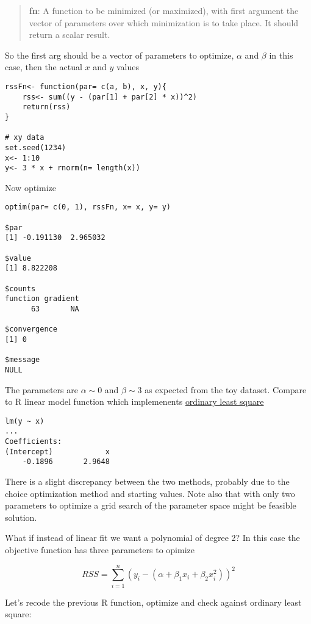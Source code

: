 \documentclass[a4paper]{article}
\begin{document}
\begin{quotation}
\noindent \textbf{fn}: A function to be minimized (or maximized), with first
argument the vector of parameters over which minimization is
to take place.  It should return a scalar result.
\end{quotation}

So the first arg should be a vector of parameters to optimize, $\alpha$ and $\beta$ in this case, then
the actual $x$ and $y$ values

\begin{verbatim}
rssFn<- function(par= c(a, b), x, y){
    rss<- sum((y - (par[1] + par[2] * x))^2)
    return(rss)
}

# xy data
set.seed(1234)
x<- 1:10
y<- 3 * x + rnorm(n= length(x))
\end{verbatim}

Now optimize

\begin{verbatim}
optim(par= c(0, 1), rssFn, x= x, y= y)

$par
[1] -0.191130  2.965032

$value
[1] 8.822208

$counts
function gradient 
      63       NA 

$convergence
[1] 0

$message
NULL
\end{verbatim}

The parameters are $\alpha \sim 0$ and $\beta \sim 3$ as expected from the toy dataset. Compare to R linear model function which
implemenents \href{https://en.wikipedia.org/wiki/Ordinary_least_squares}{ordinary least square}

\begin{verbatim}
lm(y ~ x)
...
Coefficients:
(Intercept)            x  
    -0.1896       2.9648
\end{verbatim}

There is a slight discrepancy between the two methods, probably due to the choice optimization method and starting values.
Note also that with only two parameters to optimize a grid search of the parameter space might be feasible solution.

What if instead of linear fit we want a polynomial of degree 2? In this case the objective function has three parameters to
opimize

$$
RSS= \sum_{i= 1}^{n}(y_i - (\alpha + \beta_1 x_i + \beta_2 x_i^2))^2
$$

Let's recode the previous R function, optimize and check against ordinary least square:
\end{document}
